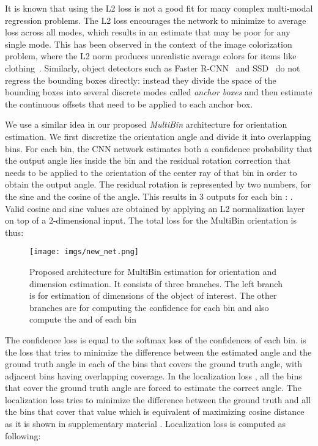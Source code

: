 \documentclass[10pt,twocolumn,letterpaper]{article}
\begin{document}
It is known that using the L2 loss is not a good fit for many complex multi-modal regression problems. The L2 loss encourages the network to minimize to average loss across all modes, which results in an estimate that may be poor for any single mode. This has been observed in the context of the image colorization problem, where the L2 norm produces unrealistic average colors for items like clothing~\cite{ZhangColorization16}. Similarly, object detectors such as Faster R-CNN~\cite{YOLO_CVPR16} and SSD~\cite{SSD_ECCV16} do not regress the bounding boxes directly: instead they divide the space of the bounding boxes into several discrete modes called \emph{anchor boxes} and then estimate the continuous offsets that need to be applied to each anchor box. 

We use a similar idea in our proposed \emph{MultiBin} architecture for orientation estimation. We first discretize the orientation angle and divide it into  overlapping bins. For each bin, the CNN network estimates both a confidence probability  that the output angle lies inside the  bin and the residual rotation correction that needs to be applied to the orientation of the center ray of that bin in order to obtain the output angle. The residual rotation is represented by two numbers, for the sine and the cosine of the angle. This results in 3 outputs for each bin : . Valid cosine and sine values are obtained by applying an L2 normalization layer on top of a 2-dimensional input. The total loss for the MultiBin orientation is thus:

\begin{figure}
\centering
\texttt{[image: imgs/new\_net.png]}
\caption{Proposed architecture for MultiBin estimation for orientation and dimension estimation. It consists of three branches. The left branch is for estimation of dimensions of the object of interest. The other branches are for computing the confidence for each bin and also compute the  and  of each bin}
\label{fig:net}
\end{figure}
The confidence loss  is equal to the softmax loss of the confidences of each bin.  is the loss that tries to minimize the difference between the estimated angle and the ground truth angle in each of the bins that covers the ground truth angle, with adjacent bins having overlapping coverage. In the localization loss , all the bins that cover the ground truth angle are forced to estimate the correct angle. The localization loss tries to minimize the difference between the ground truth and all the bins that cover that value which is equivalent of maximizing cosine distance as it is shown in supplementary material \cite{Supplementary}. Localization loss  is computed as following:
\end{document}
